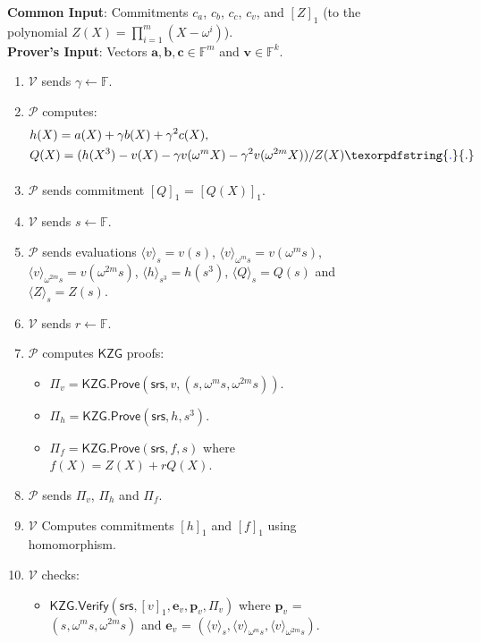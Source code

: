 \documentclass[sigconf]{acmart}
\renewcommand{\vec}{\mathbf} %
\newcommand{\F}{\mathbb{F}}
\newcommand{\srs}{\mathsf{srs}}
\newcommand{\val}[2]{\ensuremath{\langle {#2}\rangle_{#1}}} %
\newcommand{\gone}[1]{\ensuremath{\left[{#1}\right]_1}}
\newcommand{\prover}{\ensuremath{\mathcal{P}}}
\newcommand{\verifier}{\ensuremath{\mathcal{V}}}
\newcommand{\kzg}{\ensuremath{\mathsf{KZG}}}
\newcommand{\kzgprove}{\ensuremath{\mathsf{KZG.Prove}}}
\newcommand{\kzgverify}{\ensuremath{\mathsf{KZG.Verify}}}
\providecommand{\DIFaddtex}[1]{{\protect\color{blue}\uwave{#1}}} %
\providecommand{\DIFaddFL}[1]{\DIFadd{#1}} %
\providecommand{\DIFaddbeginFL}{} %
\providecommand{\DIFaddendFL}{} %
\providecommand{\DIFadd}[1]{\texorpdfstring{\DIFaddtex{#1}}{#1}} %
\newcommand{\DIFaddincludegraphics}[2][]{{\color{blue}\fbox{\DIFOincludegraphics[#1]{#2}}}} %
\DeclareRobustCommand{\DIFaddbeginFL}{\DIFOaddbeginFL \let\includegraphics\DIFaddincludegraphics} %
\DeclareRobustCommand{\DIFaddendFL}{\DIFOaddendFL \let\includegraphics\DIFOincludegraphics} %
\begin{document}
		\begin{figure}[tb!]
			\scriptsize
			\begin{mdframed}
				{
					{\bf Common Input}: Commitments $c_a$, $c_b$, $c_c$, $c_v$, and $\gone{Z}$ (to the polynomial
					$Z(X)=\prod_{i=1}^m (X-\omega^i)$). \\
					{\bf Prover's Input}: Vectors $\vec{a},\vec{b},\vec{c}\in\F^m$ and $\vec{v}\in \F^k$.
					\begin{enumerate}[leftmargin=1em, label=\arabic*.]
						\item $\verifier$ sends $\gamma\gets \F$.
						\item $\prover$ computes:
						\begin{align}
							& h(X) = a(X) + \gamma b(X) + \gamma^2 c(X),\\
							& Q(X) = (h(X^3) - v(X) - \gamma v(\omega^m X) - \gamma^2 v(\omega^{2m} X))/Z(X)\DIFaddbeginFL \DIFaddFL{.
							}\DIFaddendFL \end{align}
						\item $\prover$ sends commitment $\gone{Q}$ = $\gone{Q(X)}$.
						\item $\verifier$ sends $s\gets\F$.
						\item $\prover$ sends evaluations $\val{s}{v}=v(s)$, $\val{\omega^m s}{v}=v(\omega^m s)$,
						$\val{\omega^{2m}s}{v}=v(\omega^{2m} s)$, $\val{s^3}{h}=h(s^3)$, $\val{s}{Q}=Q(s)$ and $\val{s}{Z}=Z(s)$.
						\item $\verifier$ sends $r\gets\F$.
						\item $\prover$ computes $\kzg$ proofs:
						\begin{itemize}[leftmargin=1em]
							\item $\Pi_v=\kzgprove(\srs,v,(s,\omega^m s, \omega^{2m}s))$.
							\item $\Pi_h=\kzgprove(\srs,h,s^3)$.
							\item $\Pi_f=\kzgprove(\srs,f,s)$ where $f(X)=Z(X) + rQ(X)$.
						\end{itemize}
						\item $\prover$ sends $\Pi_v$, $\Pi_h$ and $\Pi_f$.
						\item $\verifier$ Computes commitments $\gone{h}$ and $\gone{f}$ using homomorphism.
						\item $\verifier$ checks:
						\begin{itemize}[leftmargin=1em]
							\item $\kzgverify(\srs,\gone{v}, \vec{e}_v, \vec{p}_v, \Pi_v)$ where
							$\vec{p}_v$ = $(s,\omega^m s, \omega^{2m}s)$ and $\vec{e}_v$ = $(\val{s}{v}, \val{\omega^m s}{v}, \val{\omega^{2m} s}{v})$.

\end{itemize}
\end{enumerate}}
\end{mdframed}
\end{figure}
\end{document}
